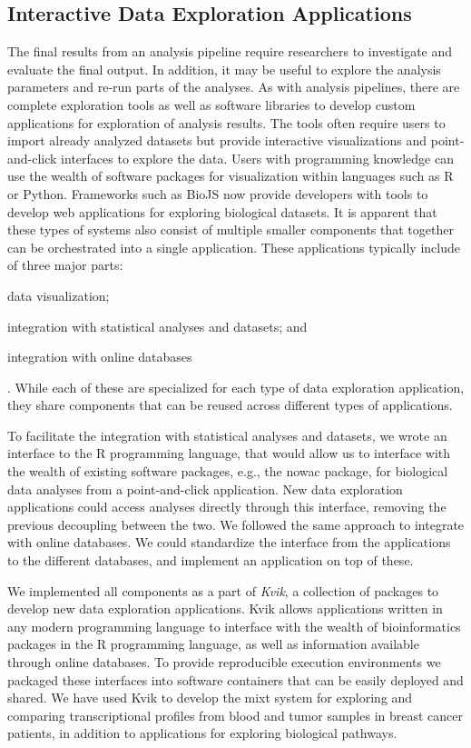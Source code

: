 \subsection{Interactive Data Exploration Applications}
The final results from an analysis pipeline require researchers to investigate
and evaluate the final output. In addition, it may be useful to explore the
analysis parameters and re-run parts of the analyses. 
As with analysis pipelines, there are complete exploration tools as
well as software libraries to develop custom applications for exploration of
analysis results. The tools often require users to import already analyzed
datasets but provide interactive visualizations and point-and-click interfaces
to explore the data. Users with programming knowledge can use the wealth of
software packages for visualization within languages such as R or Python.
Frameworks such as BioJS\cite{gomez2013biojs} now provide developers with tools
to develop web applications for exploring biological datasets. It is apparent
that 
these types of systems also consist of multiple smaller components that
together can be orchestrated into a single application. These applications
typically include of three major parts:
\begin{enumerate*}[label=(\roman*)]
    \item data visualization;
    \item integration with statistical analyses and datasets; and 
    \item integration with online databases
\end{enumerate*}. 
While each of these are specialized for each type of data exploration
application, they share components that can be reused across different types of
applications. 

To facilitate the integration with statistical analyses and datasets, we wrote
an interface to the R programming language, that would allow us to interface
with the wealth of existing software packages, e.g.,  the \gls{nowac} package,
for biological data analyses from a point-and-click application. New data
exploration applications could access analyses directly through this interface,
removing the previous decoupling between the two. We followed the same approach
to integrate with online databases. We could standardize the interface from the
applications to the different databases, and implement an application on top of
these. 

We implemented all components as a part of \emph{Kvik}, a collection of packages
to develop new data exploration applications.\cite{fjukstad2015kvik} Kvik allows
applications written in any modern programming language to interface with the
wealth of bioinformatics packages in the R programming language, as well as
information available through online databases. To provide reproducible
execution environments we packaged these interfaces into  software containers
that can be easily deployed and shared.  We have used Kvik to develop the
\gls{mixt} system\cite{fjukstad2017building} for exploring and comparing
transcriptional profiles from blood and tumor samples in breast cancer patients,
in addition to applications for exploring biological
pathways\cite{fjukstad2015kvik}. 


